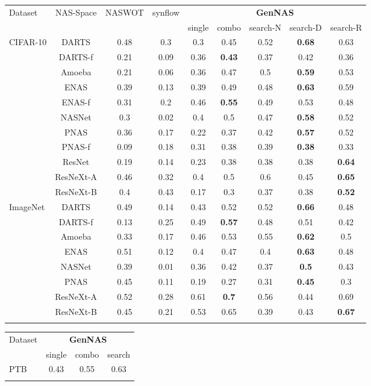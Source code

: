 \documentclass{article}
\begin{document}
\begin{table}[!h]
\begin{tabular}{lccc|ccccc}
\Xhline{0.8pt}
\multicolumn{9}{l}{\textbf{Neural Design Spaces}} \\ \hline
Dataset & NAS-Space & NASWOT & synflow &  \multicolumn{5}{c}{\textbf{GenNAS}}  \\ \cline{5-9}
 & & & & single & combo & search-N & search-D & search-R \\\hline
CIFAR-10 & DARTS & 0.48&	0.3&	0.3	&0.45&	0.52	&\textbf{0.68}&	0.63\\
& DARTS-f & 0.21&	0.09&	0.36	&\textbf{0.43}&	0.37&	0.42&	0.36 \\
& Amoeba &0.21	&0.06&	0.36&	0.47&	0.5&	\textbf{0.59}&	0.53 \\
& ENAS & 0.39&	0.13&	0.39&	0.49&	0.48&	\textbf{0.63}&	0.59 \\
& ENAS-f & 0.31&	0.2&	0.46&	\textbf{0.55}&	0.49&	0.53&	0.48\\
& NASNet &0.3&	0.02&	0.4	&0.5&	0.47&	\textbf{0.58}&	0.52  \\
& PNAS &  0.36&	0.17&	0.22&	0.37&	0.42&	\textbf{0.57}&	0.52\\
& PNAS-f & 0.09&	0.18&	0.31&	0.38&	0.39&	\textbf{0.38}&	0.33 \\
& ResNet & 0.19	&0.14&	0.23&	0.38&	0.38&	0.38&	\textbf{0.64 }\\
& ResNeXt-A &0.46&	0.32&	0.4&	0.5	&0.6	&0.45&	\textbf{0.65} \\
& ResNeXt-B &0.4&	0.43&	0.17&	0.3	&0.37&	0.38&	\textbf{0.52} \\

\hline

ImageNet & DARTS & 0.49	&0.14	&0.43&	0.52&	0.52&\textbf{	0.66}&	0.48 \\
 & DARTS-f & 0.13&	0.25&	0.49&	\textbf{0.57}&	0.48&	0.51&	0.42\\
 & Amoeba & 0.33&	0.17&	0.46&	0.53&	0.55&	\textbf{0.62}&	0.5 \\
 & ENAS &0.51&	0.12&	0.4&	0.47&	0.4	&\textbf{0.63}&	0.48  \\
 & NASNet &0.39	&0.01&	0.36&	0.42&	0.37	&\textbf{0.5}&	0.43  \\
 & PNAS &  0.45&	0.11&	0.19&	0.27&	0.31&	\textbf{0.45}&	0.3\\
 & ResNeXt-A & 0.52	&0.28	&0.61&	\textbf{0.7}	&0.56&	0.44&	0.69\\
 & ResNeXt-B & 0.45&	0.21&	0.53&	0.65&	0.39&	0.43&	\textbf{0.67}\\
\Xhline{0.8pt}
\end{tabular}

\begin{tabular}{lccc}
\Xhline{0.8pt}
\multicolumn{4}{l}{\textbf{NASBench-NLP}} \\ \hline
Dataset  & \multicolumn{3}{c}{\textbf{GenNAS}} \\ \cline{2-4}
 & single & combo & search \\\hline
PTB &  0.43	&0.55&	0.63\\\Xhline{0.8pt}

\end{tabular}
\end{table}
\end{document}
